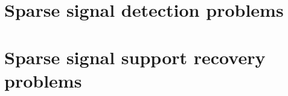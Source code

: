 \section{Sparse signal detection problems}
\label{sec:global-tests}


\section{Sparse signal support recovery problems}
\label{sec:additive-error-model-boundaries}



%




